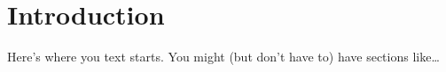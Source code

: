 \chapter{Introduction}

Here's where you text starts. You might (but don't have to) have sections like\dots
